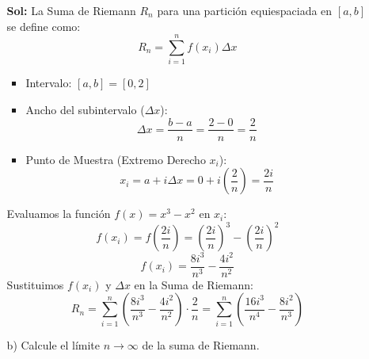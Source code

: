 \documentclass[letterpaper,12pt]{article}
\theoremstyle{plain}
\theoremstyle{definition}
\begin{document}
\begin{enumerate}
\begin{itemize}
        
\color{blue}
\textbf{Sol:} La Suma de Riemann $R_n$ para una partición equiespaciada en $[a, b]$ se define como:
$$
R_n = \sum_{i=1}^{n} f(x_i) \Delta x
$$
\begin{itemize}
    \item Intervalo: $[a, b] = [0, 2]$
    \item Ancho del subintervalo ($\Delta x$):
    $$
    \Delta x = \frac{b-a}{n} = \frac{2-0}{n} = \frac{2}{n}
    $$
    \item Punto de Muestra (Extremo Derecho $x_i$):
    $$
    x_i = a + i \Delta x = 0 + i \left(\frac{2}{n}\right) = \frac{2i}{n}
    $$
\end{itemize}
Evaluamos la función $f(x) = x^3 - x^2$ en $x_i$:
$$
f(x_i) = f\left(\frac{2i}{n}\right) = \left(\frac{2i}{n}\right)^3 - \left(\frac{2i}{n}\right)^2
$$
$$
f(x_i) = \frac{8i^3}{n^3} - \frac{4i^2}{n^2}
$$
Sustituimos $f(x_i)$ y $\Delta x$ en la Suma de Riemann:
$$
R_n = \sum_{i=1}^{n} \left( \frac{8i^3}{n^3} - \frac{4i^2}{n^2} \right) \cdot \frac{2}{n} = \sum_{i=1}^{n} \left( \frac{16i^3}{n^4} - \frac{8i^2}{n^3} \right)
$$
\color{black}
        \item[b)] Calcule el límite $n \to \infty$ de la suma de Riemann.


\end{itemize}
\end{enumerate}
\end{document}
